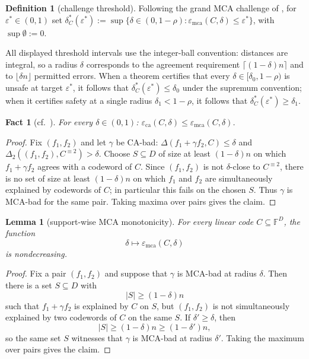 \documentclass[11pt]{article}
\newtheorem{lemma}[lemma]{Lemma}
\newtheorem{fact}[fact]{Fact}
\theoremstyle{definition}
\newtheorem{definition}[definition]{Definition}
\theoremstyle{remark}
\newcommand{\F}{\mathbb{F}}
\newcommand{\eca}{\varepsilon_{\mathrm{ca}}}
\newcommand{\emca}{\varepsilon_{\mathrm{mca}}}
\newcommand{\dist}{\Delta}
\begin{document}
\begin{definition}[challenge threshold]\label{def:dstar}
Following the grand MCA challenge of \cite[\S1]{ABF26}, for $\varepsilon^*\in(0,1)$ set
$\delta^*_C(\varepsilon^*):=\sup\{\delta\in(0,1-\rho):\emca(C,\delta)\le\varepsilon^*\}$, with $\sup\emptyset:=0$.
\end{definition}

All displayed threshold intervals use the integer-ball convention: distances are integral, so a radius $\delta$ corresponds to the agreement requirement $\lceil(1-\delta)n\rceil$ and to $\lfloor\delta n\rfloor$ permitted errors. When a theorem certifies that every $\delta\in[\delta_0,1-\rho)$ is unsafe at target $\varepsilon^*$, it follows that $\delta^*_C(\varepsilon^*)\le\delta_0$ under the supremum convention; when it certifies safety at a single radius $\delta_1<1-\rho$, it follows that $\delta^*_C(\varepsilon^*)\ge\delta_1$.

\begin{fact}[{cf.\ \cite[Fact~4.5]{ABF26}}]\label{fact:chain}
For every $\delta\in(0,1)$: $\eca(C,\delta)\le\emca(C,\delta)$.
\end{fact}

\begin{proof}
Fix $(f_1,f_2)$ and let $\gamma$ be CA-bad: $\dist(f_1+\gamma f_2,C)\le\delta$ and $\dist_2((f_1,f_2),C^{\equiv2})>\delta$. Choose $S\subseteq D$ of size at least $(1-\delta)n$ on which $f_1+\gamma f_2$ agrees with a codeword of $C$. Since $(f_1,f_2)$ is not $\delta$-close to $C^{\equiv2}$, there is no set of size at least $(1-\delta)n$ on which $f_1$ and $f_2$ are simultaneously explained by codewords of $C$; in particular this fails on the chosen $S$. Thus $\gamma$ is MCA-bad for the same pair. Taking maxima over pairs gives the claim.
\end{proof}

\begin{lemma}[support-wise MCA monotonicity]\label{lem:mca-monotone}
For every linear code $C\subseteq\F^D$, the function
\[
        \delta\longmapsto \emca(C,\delta)
\]
is nondecreasing.
\end{lemma}

\begin{proof}
Fix a pair $(f_1,f_2)$ and suppose that $\gamma$ is MCA-bad at radius $\delta$. Then there is a set $S\subseteq D$ with
\[
        |S|\ge (1-\delta)n
\]
such that $f_1+\gamma f_2$ is explained by $C$ on $S$, but $(f_1,f_2)$ is not simultaneously explained by two codewords of $C$ on the same $S$. If $\delta'\ge\delta$, then
\[
        |S|\ge (1-\delta)n\ge (1-\delta')n,
\]
so the same set $S$ witnesses that $\gamma$ is MCA-bad at radius $\delta'$. Taking the maximum over pairs gives the claim.
\end{proof}
\end{document}
